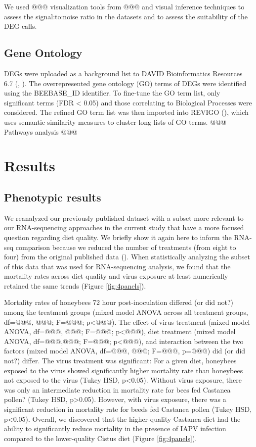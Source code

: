 \documentclass[11pt,a4paper,oldfontcommands,openany]{memoir}
\numberwithin{equation}{section} %
\begin{document}
We used @@@ visualization tools from @@@ and visual inference techniques to assess the signal:to:noise ratio in the datasets and to assess the suitability of the DEG calls. 

\subsection{Gene Ontology}

DEGs were uploaded as a background list to DAVID Bioinformatics Resources 6.7 (\citealt{davidBio}, \citealt{davidBio2}). The overrepresented gene ontology (GO) terms of DEGs were identified using the BEEBASE\_ID identifier. To fine-tune the GO term list, only significant terms (FDR < 0.05) and those correlating to Biological Processes were considered. The refined GO term list was then imported into REVIGO (\citealt{revigo}), which uses semantic similarity measures to cluster long lists of GO terms. @@@ Pathways analysis @@@

\section{Results}

\subsection{Phenotypic results}

We reanalyzed our previously published dataset with a subset more relevant to our RNA-sequencing approaches in the current study that have a more focused question regarding diet quality. We briefly show it again here to inform the RNA-seq comparison because we reduced the number of treatments (from eight to four) from the original published data (\citealt{adamInt}). When statistically analyzing the subset of this data that was used for RNA-sequencing analysis, we found that the mortality rates across diet quality and virus exposure at least numerically retained the same trends (Figure \ref{fig:4panels}).

Mortality rates of honeybees 72 hour post-inoculation differed (or did not?) among the treatment groups (mixed model ANOVA across all treatment groups, df=@@@, @@@; F=@@@; p<@@@). The effect of virus treatment (mixed model ANOVA, df=@@@, @@@; F=@@@; p<@@@), diet treatment (mixed model ANOVA, df=@@@,@@@; F=@@@; p<@@@), and interaction between the two factors (mixed model ANOVA, df=@@@, @@@; F=@@@, p=@@@) did (or did not?) differ. The virus treatment was significant: For a given diet, honeybees exposed to the virus showed significantly higher mortality rate than honeybees not exposed to the virus (Tukey HSD, p<0.05). Without virus exposure, there was only an intermediate reduction in mortality rate for bees fed Castanea pollen? (Tukey HSD, p>0.05). However, with virus exposure, there was a significant reduction in mortality rate for beeds fed Castanea pollen (Tukey HSD, p<0.05). Overall, we discovered that the higher-quality Castanea diet had the ability to significantly reduce mortality in the presence of IAPV infection compared to the lower-quality Cistus diet (Figure \ref{fig:4panels}).
\end{document}
